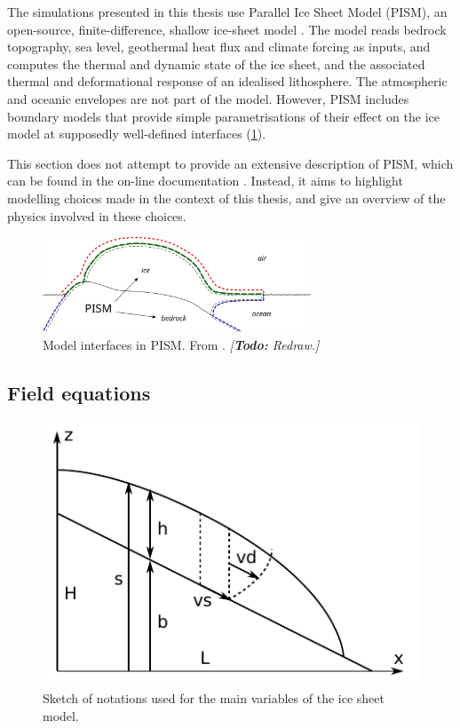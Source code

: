 \documentclass{article}
\newcommand{\todo}[1]{\emph{[\textbf{Todo:} #1]}}
\begin{document}
The simulations presented in this thesis use Parallel Ice Sheet Model (PISM),
an open-source, finite-difference, shallow ice-sheet model
\citep{PISM-authors.2014}. The model reads bedrock topography, sea level,
geothermal heat flux and climate forcing as inputs, and computes the thermal
and dynamic state of the ice sheet, and the associated thermal and
deformational response of an idealised lithosphere. The atmospheric and oceanic
envelopes are not part of the model. However, PISM includes boundary models
that provide simple parametrisations of their effect on the ice model at
supposedly well-defined interfaces (\cref{fig:model-interfaces}).

This section does not attempt to provide an extensive description of PISM,
which can be found in the on-line documentation \citep{PISM-authors.2014}.
Instead, it aims to highlight modelling choices made in the context of this
thesis, and give an overview of the physics involved in these choices.

\begin{figure}
  \centering
  \includegraphics[width=80mm]{model-interfaces}
  \caption{Model interfaces in PISM. From \citet{PISM-authors.2014}.
           \todo{Redraw.}}
  \label{fig:model-interfaces}
\end{figure}

\subsection{Field equations}

\begin{figure}
  \centering
  \includegraphics{model-variables}
  \caption{Sketch of notations used for the main variables of the ice sheet
           model.}
  \label{fig:model-variables}
\end{figure}
\end{document}
